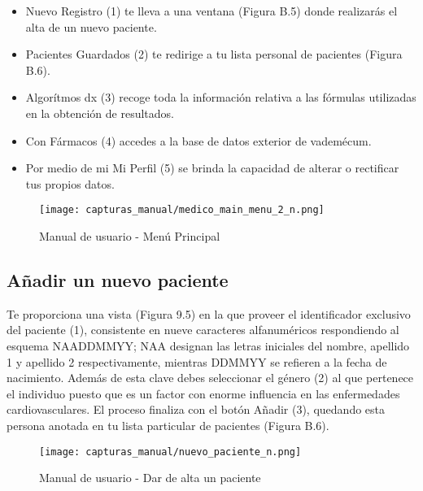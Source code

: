 \documentclass[11pt,spanish,
		listoftables,listoffigures]
		{tfgplantilla}
\begin{document}
\begin{itemize}
	\item \textquotedbl Nuevo Registro\textquotedbl{} (1) te lleva a una ventana (Figura B.5) donde realizarás el alta de un nuevo paciente.

	\item \textquotedbl Pacientes Guardados\textquotedbl{} (2) te redirige a tu lista personal de pacientes (Figura B.6).

	\item \textquotedbl Algor\'itmos dx\textquotedbl{} (3) recoge toda la información relativa a las fórmulas utilizadas en la obtención de resultados.

	\item Con \textquotedbl Fármacos\textquotedbl{} (4) accedes a la base de datos exterior de vademécum.

	\item Por medio de mi \textquotedbl Mi Perfil\textquotedbl{} (5) se brinda la capacidad de alterar o rectificar tus propios datos.
\end{itemize}

\begin{figure}[H]
\centering
\texttt{[image: capturas\_manual/medico\_main\_menu\_2\_n.png]}
\caption{Manual de usuario - Menú Principal}
\end{figure}

\subsection {Añadir un nuevo paciente}

Te proporciona una vista (Figura 9.5) en la que proveer el identificador exclusivo del paciente (1), consistente en nueve caracteres alfanuméricos respondiendo al esquema NAADDMMYY; NAA designan las letras iniciales del nombre, apellido 1 y apellido 2 respectivamente, mientras DDMMYY se refieren a la fecha de nacimiento. Además de esta clave debes seleccionar el género (2) al que pertenece el individuo puesto que es un factor con enorme influencia en las enfermedades cardiovasculares. El proceso finaliza con el botón \textquotedbl Añadir\textquotedbl{} (3), quedando esta persona anotada en tu lista particular de pacientes (Figura B.6).

\begin{figure}[H]
\centering
\texttt{[image: capturas\_manual/nuevo\_paciente\_n.png]}
\caption{Manual de usuario - Dar de alta un paciente}
\end{figure}
\end{document}
